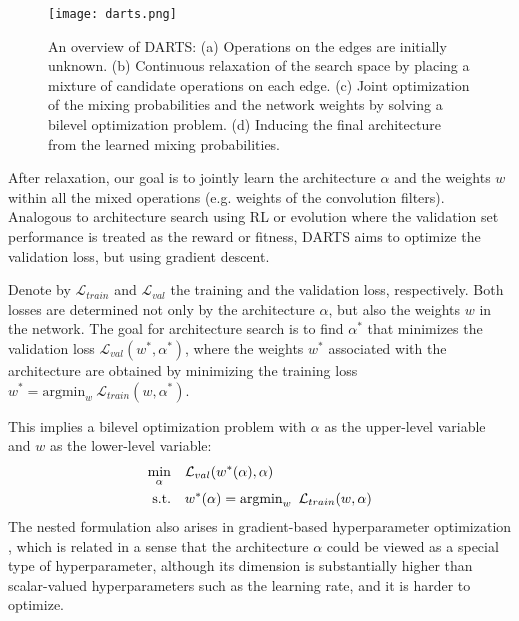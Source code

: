 \documentclass{article}
\begin{document}
\begin{figure}
	\centering
	\texttt{[image: darts.png]}
	\caption{An overview of DARTS:
		(a) Operations on the edges are initially unknown. 
		(b) Continuous relaxation of the search space by placing a mixture of candidate operations on each edge.
		(c) Joint optimization of the mixing probabilities and the network weights by solving a bilevel optimization problem.
		(d) Inducing the final architecture from the learned mixing probabilities.}
\label{fig:darts}
\end{figure}

After relaxation,
our goal is to jointly learn the architecture $\alpha$
and the weights $w$ within all the mixed operations (e.g. weights of the convolution filters).
Analogous to architecture search using RL \citep{zoph2016neural, zoph2017learning, pham2018efficient} or evolution \citep{liu2017hierarchical, real2018regularized}
where the validation set performance is treated as the reward or fitness,
DARTS aims to optimize the validation loss, but using gradient descent.

Denote by $\mathcal{L}_{train}$ and $\mathcal{L}_{val}$ the training and the validation loss, respectively.
Both losses are determined not only by the architecture $\alpha$, but also the weights $w$ in the network.
The goal for architecture search is to find $\alpha^*$ that minimizes the validation loss $\mathcal{L}_{val}(w^*, \alpha^*)$,
where the weights $w^*$ associated with the architecture are obtained by minimizing the training loss $w^* = \mathrm{argmin}_w\ \mathcal{L}_{train}(w, \alpha^*)$.

This implies a bilevel optimization problem \citep{anandalingam1992hierarchical, colson2007overview} with $\alpha$ as the upper-level variable and $w$ as the lower-level variable:
\begin{align}
	\min_\alpha \quad & \mathcal{L}_{val}(w^*(\alpha), \alpha) \label{eq:outer} \\
	\text{s.t.} \quad &w^*(\alpha) = \mathrm{argmin}_w \enskip \mathcal{L}_{train}(w, \alpha) \label{eq:inner}
\end{align}
The nested formulation also arises in gradient-based hyperparameter optimization \citep{maclaurin2015gradient, pedregosa2016hyperparameter, franceschi2018bilevel}, which is related in a sense that the architecture $\alpha$ could be viewed as a special type of hyperparameter, although its dimension is substantially higher than scalar-valued hyperparameters such as the learning rate, and it is harder to optimize.
\end{document}
